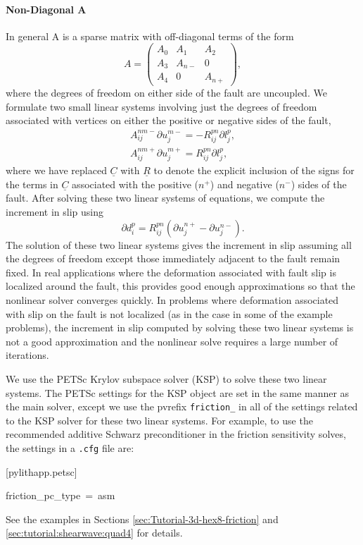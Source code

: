 \paragraph{Non-Diagonal A}

In general A is a sparse matrix with off-diagonal terms of the form
\begin{equation}
A=\left(\begin{array}{ccc}
A_{0} & A_{1} & A_{2}\\
A_{3} & A_{n-} & 0\\
A_{4} & 0 & A_{n+}
\end{array}\right),
\end{equation}
where the degrees of freedom on either side of the fault are uncoupled.
We formulate two small linear systems involving just the degrees of
freedom associated with vertices on either the positive or negative
sides of the fault,
\begin{gather}
A_{ij}^{nm-}\partial u_{j}^{m-}=-R_{ij}^{pn}\partial l_{j}^{p},\\
A_{ij}^{nm+}\partial u_{j}^{m+}=R_{ij}^{pn}\partial l_{j}^{p},
\end{gather}
where we have replaced $\underline{C}$ with $\underline{R}$ to denote
the explicit inclusion of the signs for the terms in $\underline{C}$
associated with the positive ($n^{+}$) and negative ($n^{-}$) sides
of the fault. After solving these two linear systems of equations,
we compute the increment in slip using
\begin{equation}
\partial d_{i}^{p}=R_{ij}^{pn}(\partial u_{j}^{n+}-\partial u_{j}^{n-}).
\end{equation}
The solution of these two linear systems gives the increment in slip
assuming all the degrees of freedom except those immediately adjacent
to the fault remain fixed. In real applications where the deformation
associated with fault slip is localized around the fault, this provides
good enough approximations so that the nonlinear solver converges
quickly. In problems where deformation associated with slip on the
fault is not localized (as in the case in some of the example problems),
the increment in slip computed by solving these two linear systems
is not a good approximation and the nonlinear solve requires a large
number of iterations.

We use the PETSc Krylov subspace solver (KSP) to solve these two linear
systems. The PETSc settings for the KSP object are set in the same
manner as the main solver, except we use the pvrefix \texttt{friction\_}
in all of the settings related to the KSP solver for these two linear
systems. For example, to use the recommended additive Schwarz preconditioner
in the friction sensitivity solves, the settings in a \texttt{.cfg}
file are:
\begin{lyxcode}
{[}pylithapp.petsc{]}

friction\_pc\_type~=~asm
\end{lyxcode}
See the examples in Sections \vref{sec:Tutorial-3d-hex8-friction}
and \vref{sec:tutorial:shearwave:quad4} for details.


